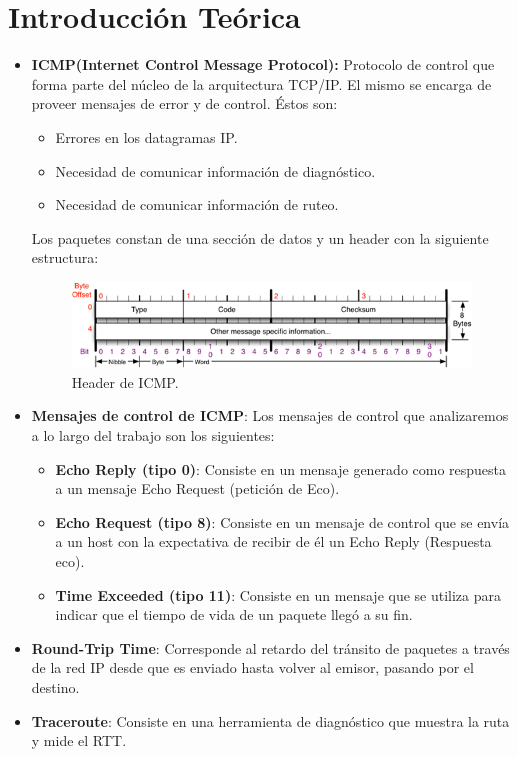 \documentclass[10pt, a4paper]{article}
\begin{document}
\section{Introducción Teórica}
\begin{itemize}
\item \textbf{ICMP(Internet Control Message Protocol):} Protocolo de control que forma parte del núcleo de la arquitectura TCP/IP. El mismo se encarga de proveer mensajes de error y de control. Éstos son:
\begin{itemize}
\item Errores en los datagramas IP.
\item Necesidad de comunicar información de diagnóstico.
\item Necesidad de comunicar información de ruteo.
\end{itemize}
Los paquetes constan de una sección de datos y un header con la siguiente estructura:

\begin{figure}[H] %
\begin{center}
\includegraphics[width=410pt]{../imgs/icmp.png}
\caption{Header de ICMP.}
\end{center}
\end{figure}

\item \textbf{Mensajes de control de ICMP}:
Los mensajes de control que analizaremos a lo largo del trabajo son los siguientes:
\begin{itemize}
\item \textbf{Echo Reply (tipo 0)}: Consiste en un mensaje generado como respuesta a un mensaje Echo Request (petición de Eco).
\item \textbf{Echo Request (tipo 8)}: Consiste en un mensaje de control que se envía a un host con la expectativa de recibir de él un Echo Reply (Respuesta eco).
\item \textbf{Time Exceeded (tipo 11)}: Consiste en un mensaje que se utiliza para indicar que el tiempo de vida de un paquete llegó a su fin.
\end{itemize}

\item \textbf{Round-Trip Time}: Corresponde al retardo del tránsito de paquetes a través de la red IP desde que es enviado hasta volver al emisor, pasando por el destino.

\item \textbf{Traceroute}: Consiste en una herramienta de diagnóstico que muestra la ruta y mide el RTT.
\end{itemize}
\end{document}
